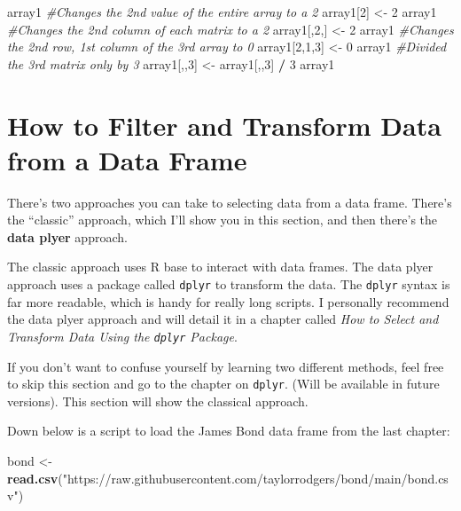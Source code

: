 \documentclass[
]{book}
\newenvironment{Shaded}{\begin{snugshade}}{\end{snugshade}}
\newcommand{\CommentTok}[1]{\textcolor[rgb]{0.56,0.35,0.01}{\textit{#1}}}
\newcommand{\DecValTok}[1]{\textcolor[rgb]{0.00,0.00,0.81}{#1}}
\newcommand{\KeywordTok}[1]{\textcolor[rgb]{0.13,0.29,0.53}{\textbf{#1}}}
\newcommand{\NormalTok}[1]{#1}
\newcommand{\OperatorTok}[1]{\textcolor[rgb]{0.81,0.36,0.00}{\textbf{#1}}}
\newcommand{\StringTok}[1]{\textcolor[rgb]{0.31,0.60,0.02}{#1}}
\begin{document}
\begin{center}
\begin{Shaded}
\begin{Highlighting}[]
\NormalTok{array1 }
\CommentTok{#Changes the 2nd value of the entire array to a 2}
\NormalTok{array1[}\DecValTok{2}\NormalTok{] <-}\StringTok{ }\DecValTok{2}
\NormalTok{array1}
\CommentTok{#Changes the 2nd column of each matrix to a 2}
\NormalTok{array1[,}\DecValTok{2}\NormalTok{,] <-}\StringTok{ }\DecValTok{2}
\NormalTok{array1}
\CommentTok{#Changes the 2nd row, 1st column of the 3rd array to 0}
\NormalTok{array1[}\DecValTok{2}\NormalTok{,}\DecValTok{1}\NormalTok{,}\DecValTok{3}\NormalTok{] <-}\StringTok{ }\DecValTok{0}
\NormalTok{array1}
\CommentTok{#Divided the 3rd matrix only by 3}
\NormalTok{array1[,,}\DecValTok{3}\NormalTok{] <-}\StringTok{ }\NormalTok{array1[,,}\DecValTok{3}\NormalTok{] }\OperatorTok{/}\StringTok{ }\DecValTok{3}
\NormalTok{array1}
\end{Highlighting}
\end{Shaded}

\hypertarget{how-to-filter-and-transform-data-from-a-data-frame}{%
\section{How to Filter and Transform Data from a Data Frame}\label{how-to-filter-and-transform-data-from-a-data-frame}}

There's two approaches you can take to selecting data from a data frame. There's the ``classic'' approach, which I'll show you in this section, and then there's the \textbf{data plyer} approach.

The classic approach uses R base to interact with data frames. The data plyer approach uses a package called \texttt{dplyr} to transform the data. The \texttt{dplyr} syntax is far more readable, which is handy for really long scripts. I personally recommend the data plyer approach and will detail it in a chapter called \emph{How to Select and Transform Data Using the \texttt{dplyr} Package}.

If you don't want to confuse yourself by learning two different methods, feel free to skip this section and go to the chapter on \texttt{dplyr}. (Will be available in future versions). This section will show the classical approach.

Down below is a script to load the James Bond data frame from the last chapter:

\begin{Shaded}
\begin{Highlighting}[]
\NormalTok{bond <-}\StringTok{ }\KeywordTok{read.csv}\NormalTok{(}\StringTok{"https://raw.githubusercontent.com/taylorrodgers/bond/main/bond.csv"}\NormalTok{)}
\end{Highlighting}
\end{Shaded}


\end{center}
\end{document}
